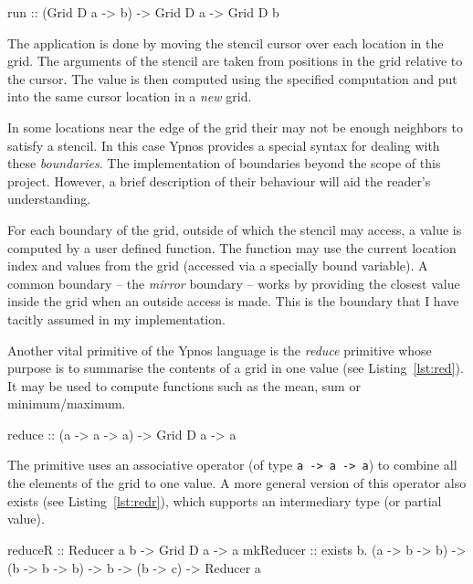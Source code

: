 \documentclass[12pt,a4paper,twoside]{scrbook}
\begin{document}
\begin{hflisting}[label={lst:run}, caption=The basic run primitive as defined in
  the original Ypnos paper\cite{ypnos-damp10}.]
run :: (Grid D a -> b) -> Grid D a -> Grid D b
\end{hflisting}

The application is done by moving the stencil cursor over each location
in the grid. The arguments of the stencil are taken from positions in
the grid relative to the cursor. The value is then computed using the
specified computation and put into the same cursor location in a
\emph{new} grid.

In some locations near the edge of the grid their may not be enough neighbors to
satisfy a stencil. In this case Ypnos provides a special syntax for dealing with
these \emph{boundaries}. The implementation of boundaries beyond the scope of
this project. However, a brief description of their behaviour will aid the
reader's understanding.

For each boundary of the grid, outside of which the stencil may access, a value
is computed by a user defined function. The function may use the current
location index and values from the grid (accessed via a specially bound
variable). A common boundary -- the \emph{mirror} boundary -- works by providing
the closest value inside the grid when an outside access is made. This is the
boundary that I have tacitly assumed in my implementation.

Another vital primitive of the Ypnos language is the \emph{reduce} primitive
whose purpose is to summarise the contents of a grid in one value (see
Listing~\ref{lst:red}). It may be used to compute functions such as the mean,
sum or minimum/maximum.

\begin{hflisting}[label={lst:red}, caption=The basic reduction primitive as
  defined in the original Ypnos paper.]
reduce :: (a -> a -> a) -> Grid D a -> a
\end{hflisting}

The primitive uses an associative operator (of type \texttt{a -\textgreater{} a
  -\textgreater{} a}) to combine all the elements of the grid to one value. A
more general version of this operator also exists (see Listing~\ref{lst:redr}),
which supports an intermediary type (or partial value).

\begin{hflisting}[label={lst:redr}, caption=The more general version of the
  reducer allowing for intermediary values.]
reduceR :: Reducer a b -> Grid D a -> a mkReducer :: exists b. (a -> b -> b)
-> (b -> b -> b) -> b -> (b -> c) -> Reducer a
\end{hflisting}
\end{document}

